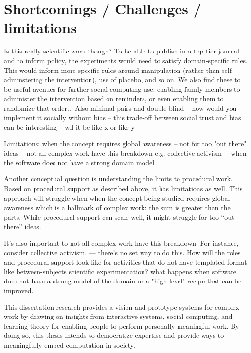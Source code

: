 \section{Shortcomings / Challenges / limitations}
Is this really scientific work though? To be able to publish in a top-tier journal and to inform policy, the experiments would need to satisfy domain-specific rules. This would inform more specific rules around manipulation (rather than self-adminstering the intervention), use of placebo, and so on. We also find these to be useful avenues for further social computing use: enabling family members to administer the intervention based on reminders, or even enabling them to randomize that order... 
	Also minimal pairs and double blind -- how would you implement it socially without bias -- this trade-off between social trust and bias can be interesting -- wll it be like x or like y

Limitations: when the concept requires global awareness -- not for too "out there" ideas -- not all complex work have this breakdown e.g. collective activism - -when the software does not have a strong domain model

Another conceptual question is understanding the limits to procedural work. Based on procedural support as described above, it has limitations as well. This approach will struggle when when the concept being studied requires global awareness which is a hallmark of complex work: the sum is greater than the parts.  While procedural support can scale well, it might struggle for too “out there” ideas.

It's also important to not all complex work have this breakdown. For instance, consider collective activism. — there’s no set way to do this. How will the roles and procedural support look like for activities that do not have templated format like between-subjects scientific experimentation?  what happens when software does not have a strong model of the domain or a "high-level" recipe that can be improved.




This dissertation research provides a vision and prototype systems for complex work by drawing on insights from interactive systems, social computing, and learning theory  for enabling people to perform personally meaningful work. By doing so, this thesis intends to democratize expertise and provide ways to meaningfully embed computation in society. 
